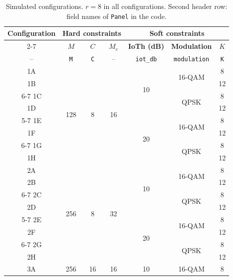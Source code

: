 \begin{table}[htbp]
\caption[Simulated configurations.]{Simulated configurations. $r = 8$ in all configurations. Second header row: field names of \texttt{Panel} in the code.}
\label{tab:paineis}
\vspace{4pt} %
\centering
\footnotesize
\renewcommand{\arraystretch}{1.2}
\setlength{\aboverulesep}{0pt}
\setlength{\belowrulesep}{0pt}
\begin{tabular}{|c|c|c|c|c|c|c|}
\toprule
\multirow{2}{*}{\textbf{Configuration}} & \multicolumn{3}{c|}{\textbf{Hard constraints}} & \multicolumn{3}{c|}{\textbf{Soft constraints}} \\
\cline{2-7}
 & {\boldmath $M$} & {\boldmath $C$} & {\boldmath $M_c$} & \textbf{IoTh (dB)} & \textbf{Modulation} & {\boldmath $K$} \\
-- & \texttt{M} & \texttt{C} & -- & \texttt{iot\_db} & \texttt{modulation} & \texttt{K} \\
\midrule
1A & \multirow{8}{*}{128} & \multirow{8}{*}{8} & \multirow{8}{*}{16} & \multirow{4}{*}{10} & \multirow{2}{*}{16-QAM} & 8 \\
1B & & & & & & 12 \\
\cline{6-7}
1C & & & & & \multirow{2}{*}{QPSK} & 8 \\
1D & & & & & & 12 \\
\cline{5-7}
1E & & & & \multirow{4}{*}{20} & \multirow{2}{*}{16-QAM} & 8 \\
1F & & & & & & 12 \\
\cline{6-7}
1G & & & & & \multirow{2}{*}{QPSK} & 8 \\
1H & & & & & & 12 \\
\midrule
2A & \multirow{8}{*}{256} & \multirow{8}{*}{8} & \multirow{8}{*}{32} & \multirow{4}{*}{10} & \multirow{2}{*}{16-QAM} & 8 \\
2B & & & & & & 12 \\
\cline{6-7}
2C & & & & & \multirow{2}{*}{QPSK} & 8 \\
2D & & & & & & 12 \\
\cline{5-7}
2E & & & & \multirow{4}{*}{20} & \multirow{2}{*}{16-QAM} & 8 \\
2F & & & & & & 12 \\
\cline{6-7}
2G & & & & & \multirow{2}{*}{QPSK} & 8 \\
2H & & & & & & 12 \\
\midrule
3A & \multirow{8}{*}{256} & \multirow{8}{*}{16} & \multirow{8}{*}{16} & \multirow{4}{*}{10} & \multirow{2}{*}{16-QAM} & 8 \\

\end{tabular}
\end{table}

